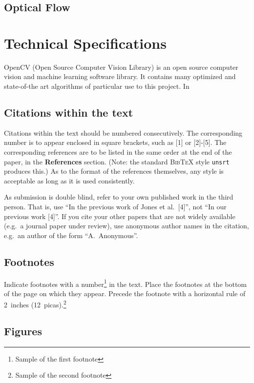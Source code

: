 \documentclass{article} %
\begin{document}
\subsection{Optical Flow}
\section{Technical Specifications}
\label{headings}

\paragraph{}OpenCV (Open Source Computer Vision Library) is an open source computer vision and machine learning software library. It contains many optimized and state-of-the art algorithms of particular use to this project. In

\subsection{Citations within the text}

Citations within the text should be numbered consecutively. The corresponding
number is to appear enclosed in square brackets, such as [1] or [2]-[5]. The
corresponding references are to be listed in the same order at the end of the
paper, in the \textbf{References} section. (Note: the standard
\textsc{Bib\TeX} style \texttt{unsrt} produces this.) As to the format of the
references themselves, any style is acceptable as long as it is used
consistently.

As submission is double blind, refer to your own published work in the 
third person. That is, use ``In the previous work of Jones et al.\ [4]'',
not ``In our previous work [4]''. If you cite your other papers that
are not widely available (e.g.\ a journal paper under review), use
anonymous author names in the citation, e.g.\ an author of the
form ``A.\ Anonymous''. 


\subsection{Footnotes}

Indicate footnotes with a number\footnote{Sample of the first footnote} in the
text. Place the footnotes at the bottom of the page on which they appear.
Precede the footnote with a horizontal rule of 2~inches
(12~picas).\footnote{Sample of the second footnote}

\subsection{Figures}
\end{document}
